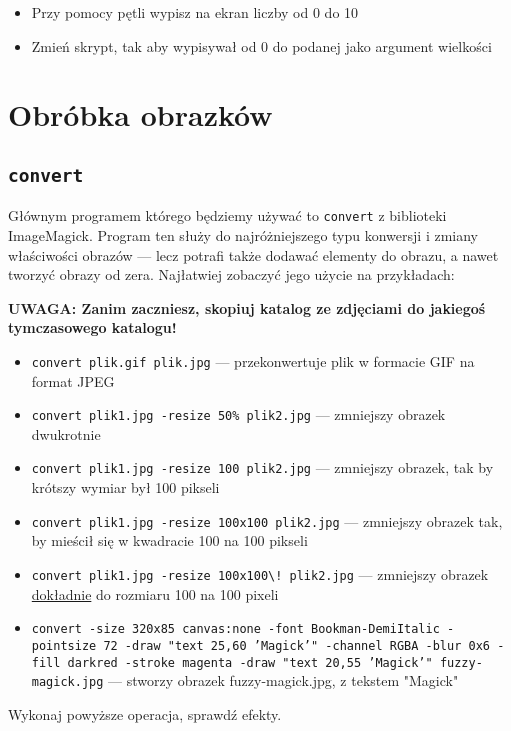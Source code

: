 \documentclass{instrukcja}
\begin{document}
\begin{itemize}
	\item Przy pomocy pętli wypisz na ekran liczby od 0 do 10
	\item Zmień skrypt, tak aby wypisywał od 0 do podanej jako argument wielkości
\end{itemize}


\section{Obróbka obrazków}
\subsection{{\tt convert}}
Głównym programem którego będziemy używać to {\tt convert} z biblioteki ImageMagick. Program ten służy do najróżniejszego typu konwersji i zmiany właściwości obrazów --- lecz potrafi także dodawać elementy do obrazu, a nawet tworzyć obrazy od zera. Najłatwiej zobaczyć jego użycie na przykładach:

{\bf UWAGA: Zanim zaczniesz, skopiuj katalog ze zdjęciami do jakiegoś tymczasowego katalogu!}

\begin{itemize}
\item {\tt convert plik.gif plik.jpg} --- przekonwertuje plik w formacie GIF na format JPEG
\item {\tt convert plik1.jpg -resize 50\% plik2.jpg} --- zmniejszy obrazek dwukrotnie
\item {\tt convert plik1.jpg -resize 100 plik2.jpg} --- zmniejszy obrazek, tak by krótszy wymiar był 100 pikseli
\item {\tt convert plik1.jpg -resize 100x100 plik2.jpg} --- zmniejszy obrazek tak, by mieścił się w kwadracie 100 na 100 pikseli
\item {\tt convert plik1.jpg -resize 100x100\textbackslash{}! plik2.jpg} --- zmniejszy obrazek \uline{dokładnie} do rozmiaru 100 na 100 pixeli
\item {\tt convert -size 320x85 canvas:none -font Bookman-DemiItalic -pointsize 72 -draw "text 25,60 'Magick'"{ }-channel RGBA -blur 0x6 -fill darkred -stroke magenta -draw "text 20,55 'Magick'"{ }fuzzy-magick.jpg} --- stworzy obrazek fuzzy-magick.jpg, z tekstem "Magick"
\end{itemize}
Wykonaj powyższe operacja, sprawdź efekty.
\end{document}

